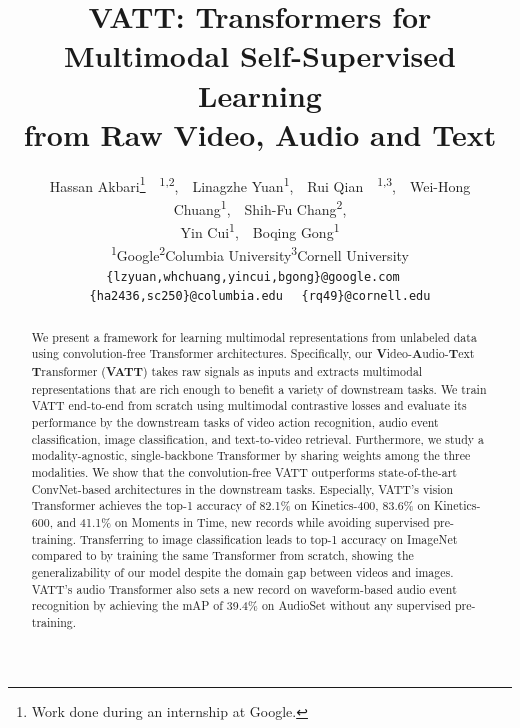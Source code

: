 \documentclass[10pt,twocolumn,letterpaper]{article}
\begin{document}
\title{VATT: Transformers for Multimodal Self-Supervised Learning \\from Raw Video, Audio and Text}

\author{Hassan Akbari\thanks{Work done during an internship at Google.}~~\textsuperscript{1,2},~~Linagzhe Yuan\textsuperscript{1},~~Rui Qian\footnotemark[1]~~\textsuperscript{1,3},~~Wei-Hong Chuang\textsuperscript{1},~~Shih-Fu Chang\textsuperscript{2},\\Yin Cui\textsuperscript{1},~~Boqing Gong\textsuperscript{1}\\
\textsuperscript{1}Google\textsuperscript{2}Columbia University\textsuperscript{3}Cornell University\\
\texttt{\tt\small\{lzyuan,whchuang,yincui,bgong\}@google.com}~~
\texttt{\tt\small\{ha2436,sc250\}@columbia.edu}~~
\texttt{\tt\small\{rq49\}@cornell.edu}
}

\maketitle


\begin{abstract}
We present a framework for learning multimodal representations from unlabeled data using convolution-free Transformer architectures. Specifically, our \textbf{V}ideo-\textbf{A}udio-\textbf{T}ext \textbf{T}ransformer (\textbf{VATT}) takes raw signals as inputs and extracts multimodal representations that are rich enough to benefit a variety of downstream tasks. We train VATT end-to-end from scratch using multimodal contrastive losses and evaluate its performance by the downstream tasks of video action recognition, audio event classification, image classification, and text-to-video retrieval. Furthermore, we study a modality-agnostic, single-backbone Transformer by sharing weights among the three modalities. 
We show that the convolution-free VATT outperforms state-of-the-art ConvNet-based architectures in the downstream tasks. 
Especially, VATT's vision Transformer achieves the top-1 accuracy of 82.1\% on Kinetics-400, 83.6\% on Kinetics-600, and 41.1\% on Moments in Time, new records while avoiding supervised pre-training.
Transferring to image classification leads to  top-1 accuracy on ImageNet compared to  by training the same Transformer from scratch, showing the generalizability of our model despite the domain gap between videos and images.
VATT's audio Transformer also sets a new record on waveform-based audio event recognition by achieving the mAP of 39.4\% on AudioSet without any supervised pre-training.
\end{abstract}
\end{document}
